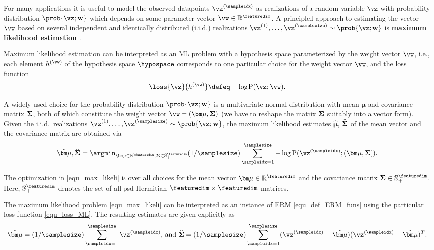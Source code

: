 \documentclass[12pt]{report}
\newcommand{\featurelen}{\featuredim}
\begin{document}
For many applications it is useful to model the observed datapoints $\vz^{(\sampleidx)}$ 
as realizations of a random variable $\vz$ with probability distribution $\prob{\vz; \mathbf{w}}$ 
which depends on some parameter vector $\vw \in \mathbb{R}^{\featuredim}$. A principled 
approach to estimating the vector $\vw$ based on several independent and identically 
distributed (i.i.d.) realizations $\vz^{(1)},\ldots,\vz^{(\samplesize)}\sim \prob{\vz; \mathbf{w}}$ is 
{\bf maximum likelihood estimation} \cite{LC}. 

Maximum likelihood estimation can be interpreted as an ML problem with a hypothesis space 
parameterized by the weight vector $\vw$, i.e., each element $h^{(\vw)}$ of the hypothesis 
space $\hypospace$ corresponds to one particular choice for the 
weight vector $\vw$, and the loss function 
\begin{equation} 
\label{equ_loss_ML}
\loss{\vz}{h^{(\vw)}} \defeq - \log {\rm P} (\vz; \vw). 
\end{equation} 

A widely used choice for the probability distribution $\prob{\vz; \mathbf{w}}$ is a multivariate normal 
distribution with mean ${\bm \mu}$ and covariance matrix ${\bf \Sigma}$, both of which constitute the 
weight vector $\vw = ({\bm \mu}, {\bf \Sigma})$ (we have to reshape the matrix ${\bf \Sigma}$ suitably 
into a vector form). Given the i.i.d.\ realizations $\vz^{(1)},\ldots,\vz^{(\samplesize)} \sim \prob{\vz; \mathbf{w}}$,  
the maximum likelihood estimates $\hat{\bm \mu}$, $\widehat{\bf \Sigma}$ of the mean vector and 
the covariance matrix are obtained via 
\begin{equation}
\label{equ_max_likeli}
\hat{\bm \mu}, \widehat{\bf \Sigma} = \argmin_{{\bm \mu} \in \mathbb{R}^{\featurelen},{\bf \Sigma} \in \mathbb{S}^{\featurelen}_{+}} (1/\samplesize) \sum_{\sampleidx=1}^{\samplesize} - \log {\rm P} (\vz^{(\sampleidx)}; ({\bm \mu},{\bf \Sigma})). 
\end{equation} 

The optimization in \eqref{equ_max_likeli} is over all choices for the mean 
vector ${\bm \mu} \in \mathbb{R}^{\featurelen}$ and the covariance matrix 
${\bf \Sigma} \in \mathbb{S}^{\featurelen}_{+}$. Here, $\mathbb{S}^{\featurelen}_{+}$ 
denotes the set of all psd Hermitian $\featurelen \times \featurelen$ matrices. 

The maximum likelihood problem \eqref{equ_max_likeli} can be 
interpreted as an instance of ERM \eqref{equ_def_ERM_funs} using the 
particular loss function \eqref{equ_loss_ML}. The resulting estimates are 
given explicitly as 
\begin{equation}
\label{equ_ML_mean_cov_Gauss} 
\hat{\bm \mu} = (1/\samplesize) \sum_{\sampleidx=1}^{\samplesize} \vz^{(\sampleidx)} \mbox{, and } \widehat{\bf \Sigma} = (1/\samplesize) \sum_{\sampleidx=1}^{\samplesize} (\vz^{(\sampleidx)} - \hat{\bm \mu})(\vz^{(\sampleidx)} - \hat{\bm \mu})^{T}.
\end{equation} 
\end{document}
